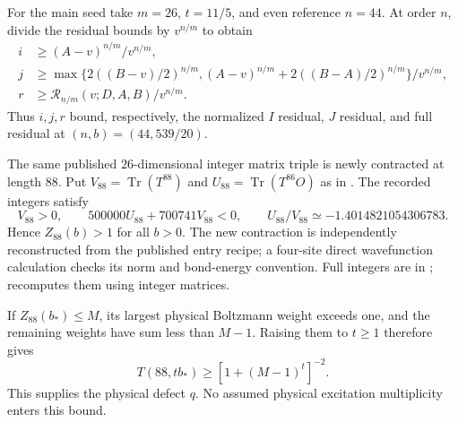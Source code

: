 \documentclass[11pt,a4paper]{article}
\DeclareMathOperator{\Tr}{Tr}
\begin{document}
For the main seed take $m=26$, $t=11/5$, and even reference $n=44$.
At order $n$, divide the residual bounds by $v^{n/m}$ to obtain
\begin{align*}
 i&\ge (A-v)^{n/m}/v^{n/m},\\
 j&\ge\max\{2((B-v)/2)^{n/m},
                (A-v)^{n/m}+2((B-A)/2)^{n/m}\}/v^{n/m},\\
 r&\ge\mathcal R_{n/m}(v;D,A,B)/v^{n/m}.
\end{align*}
Thus $i,j,r$ bound, respectively, the normalized $I$ residual,
$J$ residual, and full residual at $(n,b)=(44,539/20)$.

The same published $26$-dimensional integer matrix triple is newly
contracted at length $88$. Put $V_{88}=\Tr(T^{88})$ and
$U_{88}=\Tr(T^{86}O)$ as in \cite[Appendix C]{upstream}.
The recorded integers satisfy
\[
 V_{88}>0,\qquad 500000U_{88}+700741V_{88}<0,
 \qquad U_{88}/V_{88}\simeq-1.4014821054306783.
\]
Hence $Z_{88}(b)>1$ for all $b>0$. The new contraction is independently
reconstructed from the published entry recipe; a four-site direct
wavefunction calculation checks its norm and bond-energy convention.
Full integers are in ;
 recomputes them using integer matrices.

If $Z_{88}(b_*)\le M$, its largest physical Boltzmann weight exceeds
one, and the remaining weights have sum less than $M-1$. Raising them
to $t\ge1$ therefore gives
\[
 T(88,tb_*)\ge[1+(M-1)^t]^{-2}.
\]
This supplies the physical defect $q$. No assumed physical excitation
multiplicity enters this bound.
\end{document}
